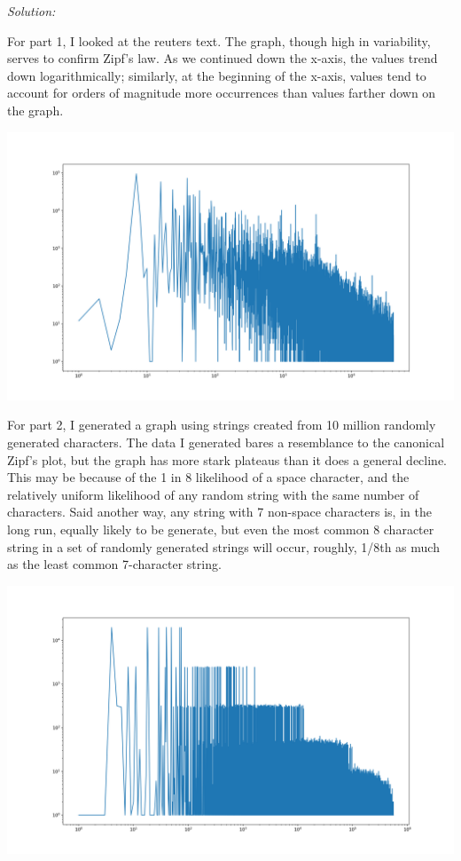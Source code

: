 \documentclass[11pt]{article}
\newenvironment{solution}{
	\vspace{10px}\noindent\emph{Solution:}
}{
	\vspace{10px}
}
\begin{document}
\begin{solution}
	
	For part 1, I looked at the reuters text. The graph, though high in variability, serves to confirm Zipf's law. As we continued down the x-axis, the values trend down logarithmically; similarly, at the beginning of the x-axis, values tend to account for orders of magnitude more occurrences than values farther down on the graph.
	
	\hspace*{-50pt}
	\includegraphics[width=550pt]{zipf_law_reuters.png}
	
	For part 2, I generated a graph using strings created from 10 million randomly generated characters. The data I generated bares a resemblance to the canonical Zipf's plot, but the graph has more stark plateaus than it does a general decline. This may be because of the 1 in 8 likelihood of a space character, and the relatively uniform likelihood of any random string with the same number of characters. Said another way, any string with 7 non-space characters is, in the long run, equally likely to be generate, but even the most common 8 character string in a set of randomly generated strings will occur, roughly, 1/8th as much as the least common 7-character string. 
	
	\hspace*{-50pt}
	\includegraphics[width=550pt]{zipf_plot_random.png}	
	

\end{solution}
\end{document}
